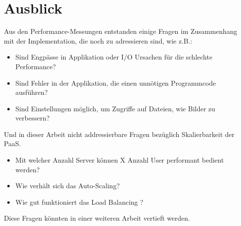 \documentclass[main.tex]{subfiles}
\begin{document}
\section{Ausblick}

Aus den Performance-Messungen entstanden einige Fragen im Zusammenhang mit der Implementation, die noch zu adressieren sind, wie z.B.: 
\begin{itemize}  
    \item Sind Engpässe in Applikation oder I/O Ursachen für die schlechte Performance? 
    \item Sind Fehler in der Applikation, die einen unnötigen Programmcode ausführen?
    \item Sind Einstellungen möglich, um Zugriffe auf Dateien, wie Bilder zu verbessern?
\end{itemize}
Und in dieser Arbeit nicht addressierbare Fragen bezüglich Skalierbarkeit der PaaS.
\begin{itemize}  
    \item Mit welcher Anzahl Server können X Anzahl User performant bedient werden?
    \item Wie verhält sich das Auto-Scaling?
    \item Wie gut funktioniert das Load Balancing ? 
\end{itemize}
Diese Fragen könnten in einer weiteren Arbeit vertieft werden. 
\end{document}
